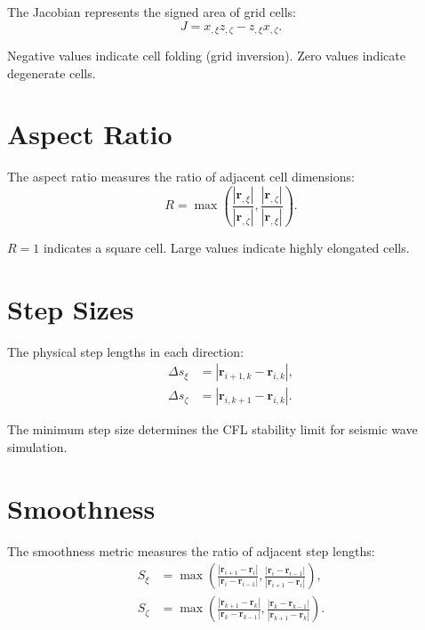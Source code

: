 \documentclass[11pt,a4paper]{report}
\newcommand{\rvec}{\bm{r}}
\begin{document}
The Jacobian represents the signed area of grid cells:
\begin{equation}
    J = x_{,\xi} z_{,\zeta} - z_{,\xi} x_{,\zeta}.
\end{equation}

Negative values indicate cell folding (grid inversion). Zero values indicate degenerate cells.

\section{Aspect Ratio}

The aspect ratio measures the ratio of adjacent cell dimensions:
\begin{equation}
    R = \max\left( \frac{|\rvec_{,\xi}|}{|\rvec_{,\zeta}|}, \frac{|\rvec_{,\zeta}|}{|\rvec_{,\xi}|} \right).
\end{equation}

$R = 1$ indicates a square cell. Large values indicate highly elongated cells.

\section{Step Sizes}

The physical step lengths in each direction:
\begin{equation}
\begin{aligned}
    \Delta s_\xi &= |\rvec_{i+1,k} - \rvec_{i,k}|, \\
    \Delta s_\zeta &= |\rvec_{i,k+1} - \rvec_{i,k}|.
\end{aligned}
\end{equation}

The minimum step size determines the CFL stability limit for seismic wave simulation.

\section{Smoothness}

The smoothness metric measures the ratio of adjacent step lengths:
\begin{equation}
\begin{aligned}
    S_\xi &= \max\left( \frac{|\rvec_{i+1} - \rvec_i|}{|\rvec_i - \rvec_{i-1}|}, \frac{|\rvec_i - \rvec_{i-1}|}{|\rvec_{i+1} - \rvec_i|} \right), \\
    S_\zeta &= \max\left( \frac{|\rvec_{k+1} - \rvec_k|}{|\rvec_k - \rvec_{k-1}|}, \frac{|\rvec_k - \rvec_{k-1}|}{|\rvec_{k+1} - \rvec_k|} \right).
\end{aligned}
\end{equation}
\end{document}

